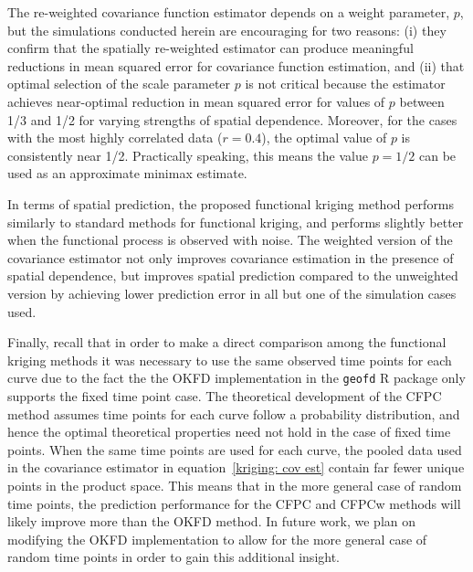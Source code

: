 The re-weighted covariance function estimator depends on a weight parameter, $p$, but the simulations conducted herein are encouraging for two reasons: (i) they confirm that the spatially re-weighted estimator can produce meaningful reductions in mean squared error for covariance function estimation, and (ii) that optimal selection of the scale parameter $p$ is not critical because the estimator achieves near-optimal reduction in mean squared error for values of $p$ between 1/3 and 1/2 for varying strengths of spatial dependence. Moreover, for the cases with the most highly correlated data ($r = 0.4$), the optimal value of $p$ is consistently near 1/2. Practically speaking, this means the value $p = 1/2$ can be used as an approximate minimax estimate. 

In terms of spatial prediction, the proposed functional kriging method performs similarly to standard methods for functional kriging, and performs slightly better when the functional process is observed with noise. The weighted version of the covariance estimator not only improves covariance estimation in the presence of spatial dependence, but improves spatial prediction compared to the unweighted version by achieving lower prediction error in all but one of the simulation cases used. 

Finally, recall that in order to make a direct comparison among the functional kriging methods it was necessary to use the same observed time points for each curve due to the fact the the OKFD implementation in the \texttt{geofd} R package only supports the fixed time point case. The theoretical development of the CFPC method assumes time points for each curve follow a probability distribution, and hence the optimal theoretical properties need not hold in the case of fixed time points. When the same time points are used for each curve, the pooled data used in the covariance estimator in equation~\eqref{kriging: cov est} contain far fewer unique points in the product space. This means that in the more general case of random time points, the prediction performance for the CFPC and CFPCw methods will likely improve more than the OKFD method. In future work, we plan on modifying the OKFD implementation to allow for the more general case of random time points in order to gain this additional insight. 

